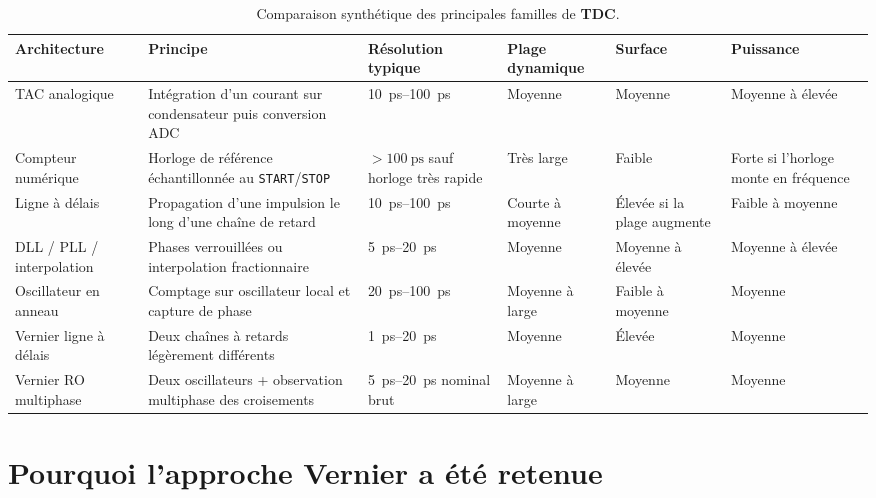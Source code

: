 \begin{table}[H]
    \centering
    \small
    \begin{tabularx}{\textwidth}{>{\raggedright\arraybackslash}p{2.5cm}>{\raggedright\arraybackslash}X>{\raggedright\arraybackslash}p{2cm}>{\raggedright\arraybackslash}p{1.9cm}>{\raggedright\arraybackslash}p{1.6cm}>{\raggedright\arraybackslash}p{1.6cm}}
        \toprule
        \textbf{Architecture} & \textbf{Principe} & \textbf{Résolution typique} & \textbf{Plage dynamique} & \textbf{Surface} & \textbf{Puissance} \\
        \midrule
        TAC analogique & Intégration d'un courant sur condensateur puis conversion ADC & \SIrange{10}{100}{\pico\second} & Moyenne & Moyenne & Moyenne à élevée \\
        Compteur numérique & Horloge de référence échantillonnée au \texttt{START}/\texttt{STOP} & $>\SI{100}{\pico\second}$ sauf horloge très rapide & Très large & Faible & Forte si l'horloge monte en fréquence \\
        Ligne à délais & Propagation d'une impulsion le long d'une chaîne de retard & \SIrange{10}{100}{\pico\second} & Courte à moyenne & Élevée si la plage augmente & Faible à moyenne \\
        DLL / PLL / interpolation & Phases verrouillées ou interpolation fractionnaire & \SIrange{5}{20}{\pico\second} & Moyenne & Moyenne à élevée & Moyenne à élevée \\
        Oscillateur en anneau & Comptage sur oscillateur local et capture de phase & \SIrange{20}{100}{\pico\second} & Moyenne à large & Faible à moyenne & Moyenne \\
        Vernier ligne à délais & Deux chaînes à retards légèrement différents & \SIrange{1}{20}{\pico\second} & Moyenne & Élevée & Moyenne \\
        Vernier RO multiphase & Deux oscillateurs + observation multiphase des croisements & \SIrange{5}{20}{\pico\second} nominal brut & Moyenne à large & Moyenne & Moyenne \\
        \bottomrule
    \end{tabularx}
    \caption{Comparaison synthétique des principales familles de \textbf{TDC}.}
    \label{tab:tdc-arch-compare}
\end{table}

\section{Pourquoi l'approche Vernier a été retenue}

